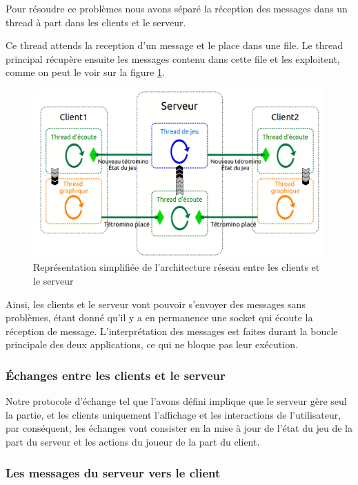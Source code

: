 \documentclass[a4paper, 12pt]{article}
\begin{document}
			Pour résoudre ce problèmes nous avons séparé la réception des messages dans un thread à part dans les clients et le serveur.

			Ce thread attends la reception d'un message et le place dans une file. Le thread principal récupère ensuite les messages contenu dans cette file et les exploitent, comme on peut le voir sur la figure \ref{fig:rezo}.

			\begin{figure}[bt]
				\centering
				\includegraphics[scale=0.35]{img/archi_reseau.png}
				\caption{Représentation simplifiée de l'architecture réseau entre les clients et le serveur}
				\label{fig:rezo}
			\end{figure}

			Ainsi, les clients et le serveur vont pouvoir s'envoyer des messages sans problèmes, étant donné qu'il y a en permanence une socket qui écoute la réception de message. L'interprétation des messages est faites durant la boucle principale des deux applications, ce qui ne bloque pas leur exécution.

		\subsubsection{\'Echanges entre les clients et le serveur}

			Notre protocole d'échange tel que l'avons défini implique que le serveur gère seul la partie, et les clients uniquement l'affichage et les interactions de l'utilisateur, par conséquent, les échanges vont consister en la mise à jour de l'état du jeu de la part du serveur et les actions du joueur de la part du client.

			\subsubsection{Les messages du serveur vers le client}
\end{document}
